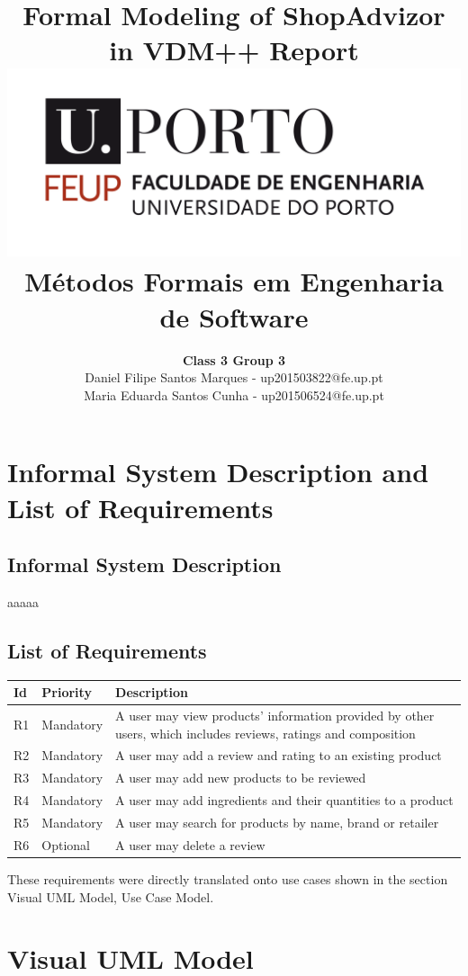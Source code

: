\documentclass{article}
\title{\Huge\textbf{Formal Modeling of ShopAdvizor in VDM++}\linebreak\linebreak\linebreak
\Large\textbf{Report}\linebreak
\linebreak\linebreak
\includegraphics[scale=0.1]{feup.png}\linebreak\linebreak
\linebreak\linebreak
\Large{Métodos Formais em Engenharia de Software}
\linebreak\linebreak
}
\author{\textbf{Class 3 Group 3}\\
Daniel Filipe Santos Marques - up201503822@fe.up.pt \\ Maria Eduarda Santos Cunha - up201506524@fe.up.pt
\\\linebreak\linebreak
\vspace{1cm}}
\begin{document}
\maketitle

\newpage
\tableofcontents
\newpage

\section{Informal System Description and List of Requirements}
\subsection{Informal System Description}
aaaaa
\subsection{List of Requirements}
\begin{table}[h]
\begin{tabular}{|p{1cm}|p{2cm}|p{8cm}|}
\hline
\textbf{Id} & \textbf{Priority} & \textbf{Description} \\
\hline
R1          & Mandatory          & A user may view products' information provided by other users, which includes reviews, ratings and composition \\
\hline
R2          & Mandatory          & A user may add a review and rating to an existing product\\
\hline
R3          & Mandatory          & A user may add new products to be reviewed \\
\hline
R4          & Mandatory          & A user may add ingredients and their quantities to a product
\\
\hline
R5          & Mandatory          & A user may search for products by name, brand or retailer \\
\hline
R6          & Optional          & A user may delete a review \\
\hline
\end{tabular}
\end{table}
These requirements were directly translated onto use cases shown in the section Visual UML Model, Use Case Model.

\section{Visual UML Model}
\end{document}
